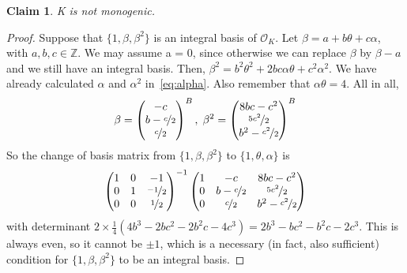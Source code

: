 \documentclass[11pt]{article}
\newtheorem{claim}[theorem]{Claim}
\theoremstyle{definition}
\begin{document}
    \begin{claim}
        K is not monogenic.
    \end{claim}
    \begin{proof}
        Suppose that $\{1, \beta, \beta^2\}$ is an integral basis of $\mathcal{O}_K$.
        Let $\beta=a+b\theta+c\alpha$, with $a,b,c \in \mathbb{Z}$.
        We may assume a = 0, since otherwise we can replace $\beta$ by $\beta - a$
        and we still have an integral basis.
        Then, $\beta^2 = b^2\theta^2+2bc\alpha\theta+c^2\alpha^2$.
        We have already calculated $\alpha$ and $\alpha^2$ in~\eqref{eq:alpha}.
        Also remember that $\alpha\theta=4$.
        All in all,
        \[
            \beta = \begin{pmatrix}
                -c \\
                b-\nicefrac{c}{2} \\
                \nicefrac{c}{2}
            \end{pmatrix}^B,\;
            \beta^2 = \begin{pmatrix}
                8bc-c^2 \\
                \nicefrac{5c^2}{2} \\
                b^2 - \nicefrac{c^2}{2}
            \end{pmatrix}^B
        \]
        So the change of basis matrix from $\{1, \beta, \beta^2\}$ to $\{1, \theta, \alpha\}$  is
        \[
            \begin{pmatrix}
                1 & 0 & -1 \\
                0 & 1 & \nicefrac{-1}{2} \\
                0 & 0 & \nicefrac{1}{2}
            \end{pmatrix}^{-1}
            \begin{pmatrix}
                1 & -c& 8bc-c^2 \\
                0 & b-\nicefrac{c}{2} & \nicefrac{5c^2}{2} \\
                0 & \nicefrac{c}{2} & b^2 - \nicefrac{c^2}{2}
            \end{pmatrix}
        \]
        with determinant $2 \times \frac{1}{4} (4b^3- 2bc^2 - 2b^2c -4c^3)
        = 2b^3-bc^2-b^2c-2c^3$.
        This is always even, so it cannot be $\pm 1$,
        which is a necessary (in fact, also sufficient) condition for $\{1, \beta, \beta^2\}$ to be an integral basis.
    \end{proof}
    
\end{document}
